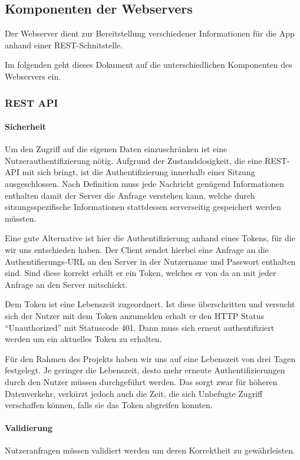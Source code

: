 \subsection{Komponenten der Webservers}
Der Webserver dient zur Bereitstellung verschiedener Informationen für die App anhand einer REST-Schnitstelle. 

Im folgenden geht dieses Dokument auf die unterschiedlichen Komponenten des Webservers ein.
\subsubsection{REST API}
\paragraph{Sicherheit}
Um den Zugriff auf die eigenen Daten einzuschränken ist eine Nutzerauthentifizierung nötig. Aufgrund der Zustandslosigkeit, die eine REST-API mit sich bringt, ist die Authentifizierung innerhalb einer Sitzung ausgeschlossen. Nach Definition muss jede Nachricht genügend Informationen enthalten damit der Server die Anfrage verstehen kann, welche durch sitzungsspezifische Informationen stattdessen serverseitig gespeichert werden müssten.

Eine gute Alternative ist hier die Authentifizierung anhand eines Tokens, für die wir uns entschieden haben. Der Client sendet hierbei eine Anfrage an die Authentifierungs-URL an den Server in der Nutzername und Passwort enthalten sind. Sind diese korrekt erhält er ein Token, welches er von da an mit jeder Anfrage an den Server mitschickt.

Dem Token ist eine Lebenszeit zugeordnert. Ist diese überschritten und versucht sich der Nutzer mit dem Token anzumelden erhalt er den HTTP Status ``Unauthorized'' mit Statuscode 401. Dann muss sich erneut authentifiziert werden um ein aktuelles Token zu erhalten.

Für den Rahmen des Projekts haben wir uns auf eine Lebenszeit von drei Tagen festgelegt. Je geringer die Lebenszeit, desto mehr erneute Authentifizierungen durch den Nutzer müssen durchgeführt werden. Das sorgt zwar für höheren Datenverkehr, verkürzt jedoch auch die Zeit, die sich Unbefugte Zugriff verschaffen können, falls sie das Token abgreifen konnten. 
\paragraph{Validierung}
Nutzeranfragen müssen validiert werden um deren Korrektheit zu gewährleisten.

